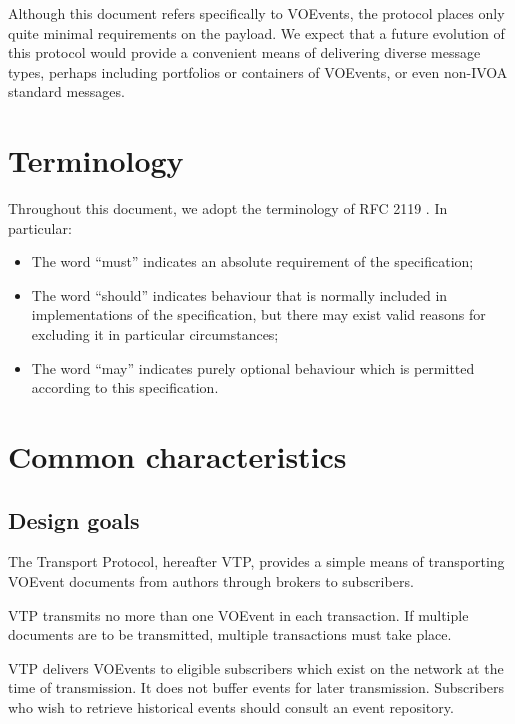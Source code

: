\documentclass[a4paper,11pt]{ivoa}
\begin{document}
Although this document refers specifically to VOEvents, the protocol places
only quite minimal requirements on the payload. We expect that a future
evolution of this protocol would provide a convenient means of delivering
diverse message types, perhaps including portfolios or containers of VOEvents,
or even non-IVOA standard messages.

\section{Terminology}

Throughout this document, we adopt the terminology of RFC 2119
\citep{Bradner:1997}. In particular:

\begin{itemize}
    \item{The word ``must'' indicates an absolute requirement of the
    specification;}

    \item{The word ``should'' indicates behaviour that is normally included in
    implementations of the specification, but there may exist valid reasons
    for excluding it in particular circumstances;}

    \item{The word ``may'' indicates purely optional behaviour which is
    permitted according to this specification.}
\end{itemize}

\section{Common characteristics}

\subsection{Design goals}
\label{sec:common:design}

The Transport Protocol, hereafter VTP, provides a simple means of transporting
VOEvent documents from authors through brokers to subscribers.

VTP transmits no more than one VOEvent in each transaction. If multiple
documents are to be transmitted, multiple transactions must take place.

VTP delivers VOEvents to eligible subscribers which exist on the network at
the time of transmission. It does not buffer events for later transmission.
Subscribers who wish to retrieve historical events should consult an event
repository.
\end{document}
